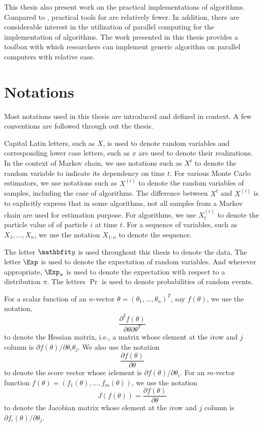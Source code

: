 This thesis also present work on the practical implementations of \smc
algorithms. Compared to \mcmc, practical tools for \smc are relatively fewer.
In addition, there are considerable interest in the utilization of parallel
computing for the implementation of \smc algorithms. The work presented in
this thesis provides a toolbox with which researchers can implement generic
\smc algorithm on parallel computers with relative ease.

\section{Notations}
\label{sec:Notations}

Most notations used in this thesis are introduced and defined in context. A
few conventions are followed through out the thesis.

Capital Latin letters, such as $X$, is used to denote random variables and
corresponding lower case letters, such as $x$ are used to denote their
realizations. In the context of Markov chain, we use notations such as $X^t$
to denote the random variable to indicate its dependency on time $t$. For
various Monte Carlo estimators, we use notations such as $X^{(i)}$ to denote
the random variables of samples, including the case of  \mcmc algorithms. The
difference between $X^t$ and $X^{(i)}$ is to explicitly express that in some
algorithms, not all samples from a Markov chain are used for estimation
purpose. For \smc algorithms, we use $X_t^{(i)}$ to denote the particle value
of of particle $i$ at time $t$. For a sequence of variables, such as
$X_1,\dots,X_n$, we use the notation $X_{1:n}$ to denote the sequence.

The letter $\data$ is used throughout this thesis to denote the data. The
letter $\Exp$ is used to denote the expectation of random variables. And
wherever appropriate, $\Exp_{\pi}$ is used to denote the expectation with
respect to a distribution $\pi$. The letters $\Pr$ is used to denote
probabilities of random events.

For a scalar function of an $n$-vector $\theta = (\theta_1,\dots,\theta_n)^T$,
say $f(\theta)$, we use the notation,
\begin{equation}
  \frac{\partial^2 f(\theta)}{\partial\theta\partial\theta^T}
\end{equation}
to denote the Hessian matrix, i.e., a matrix whose element at the $i$\xth row
and $j$\xth column is $\partial f(\theta)/\partial\theta_i\theta_j$. We also
use the notation
\begin{equation}
  \frac{\partial f(\theta)}{\partial\theta}
\end{equation}
to denote the score vector whose $i$\xth element is $\partial
f(\theta)/\partial\theta_i$. For an $m$-vector function $f(\theta) =
(f_1(\theta),\dots,f_m(\theta))$, we use the notation
\begin{equation}
  J(f(\theta)) = \frac{\partial f(\theta)}{\partial\theta}
\end{equation}
to denote the Jacobian matrix whose element at the $i$\xth row and $j$\xth
column is $\partial f_i(\theta)/\partial\theta_j$.

